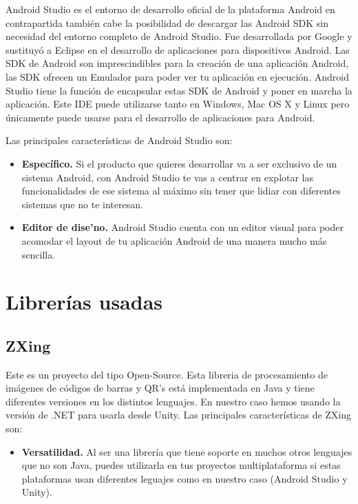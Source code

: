 Android Studio es el entorno de desarrollo oficial de la plataforma Android en contrapartida tambi\'en cabe la posibilidad de descargar las Android SDK sin necesidad del entorno completo de Android Studio. Fue desarrollada por Google y sustituy\'o a Eclipse en el desarrollo de aplicaciones para dispositivos Android. Las SDK de Android son imprescindibles para la creaci\'on de una aplicaci\'on Android, las SDK ofrecen un Emulador para poder ver tu aplicaci\'on en ejecuci\'on. Android Studio tiene la funci\'on de encapsular estas SDK de Android y poner en marcha la aplicaci\'on. Este IDE puede utilizarse tanto en Windows, Mac OS X y Linux pero \'unicamente puede usarse para el desarrollo de aplicaciones para Android.


Las principales caracter\'isticas de Android Studio son:

\begin{itemize}

\item \textbf{Espec\'ifico.} Si el producto que quieres desarrollar va a ser exclusivo de un sistema Android, con Android Studio te vas a centrar en explotar las funcionalidades de ese sistema al m\'aximo sin tener que lidiar con diferentes sistemas que no te interesan.
\item \textbf{Editor de dise'no.} Android Studio cuenta con un editor visual para poder acomodar el layout de tu aplicaci\'on Android de una manera mucho m\'as sencilla.

\end{itemize}
\section{Librer\'ias usadas}
\subsection{ZXing}
\label{cap2:subsec:zxing}

Este es un proyecto del tipo Open-Source. Esta libreria de procesamiento de im\'agenes de c\'odigos de barras y QR's est\'a implementada en Java y tiene diferentes versiones en los distintos lenguajes. En nuestro caso hemos usando la versi\'on de .NET para usarla desde Unity.
Las principales caracter\'isticas de ZXing son:

\begin{itemize}

\item \textbf{Versatilidad.} Al ser una librer\'ia que tiene soporte en muchos otros lenguajes que no son Java, puedes utilizarla en tus proyectos multiplataforma si estas plataformas usan diferentes leguajes como en nuestro caso (Android Studio y Unity).

\end{itemize}
